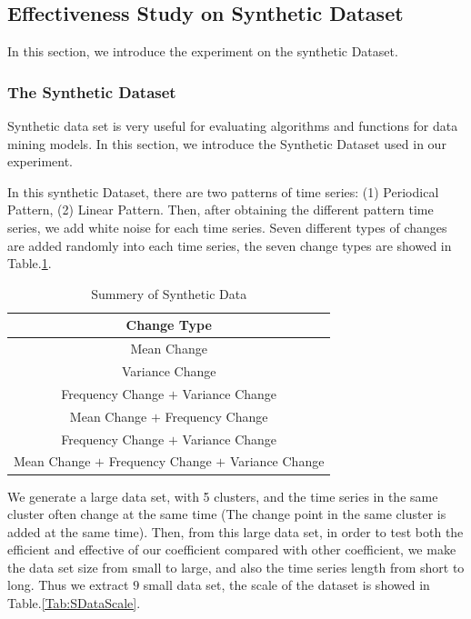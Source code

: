 \subsection{Effectiveness Study on Synthetic Dataset}

In this section, we introduce the experiment on the synthetic Dataset.

\subsubsection{The Synthetic Dataset}

Synthetic data set is very useful for evaluating algorithms and functions  for data mining models\cite{han2011data}. 
In this section, we introduce the Synthetic Dataset used in our experiment.

In this synthetic Dataset, there are two patterns of time series: (1) Periodical Pattern, (2) Linear Pattern. 
Then, after obtaining the different pattern time series, we add white noise for each time series.
Seven different types of changes are added randomly into each time series, the seven change types are showed in Table.\ref{Tab:ChangeType}.

\begin{table}[t]
\caption{Summery of Synthetic Data}
\centering

\begin{tabular}{|c|}
\hline Change Type \\
\hline Mean Change \\
\hline Variance Change\\
\hline Frequency Change $+$ Variance Change\\
\hline Mean Change $+$ Frequency Change \\
\hline Frequency Change $+$ Variance Change\\
\hline Mean Change $+$ Frequency Change $+$ Variance Change\\
\hline
\end{tabular}
\label{Tab:ChangeType}
\end{table}

We generate a large data set, with 5 clusters, and the time series in the same cluster often change at the same time (The change point in the same cluster is added at the same time). Then, from this large data set, in order to test both the efficient and effective of our coefficient compared with other coefficient, we make the data set size from small to large, and also the time series length from short to long.
Thus we extract $9$ small data set, the scale of the dataset is showed in Table.\ref{Tab:SDataScale}. 

